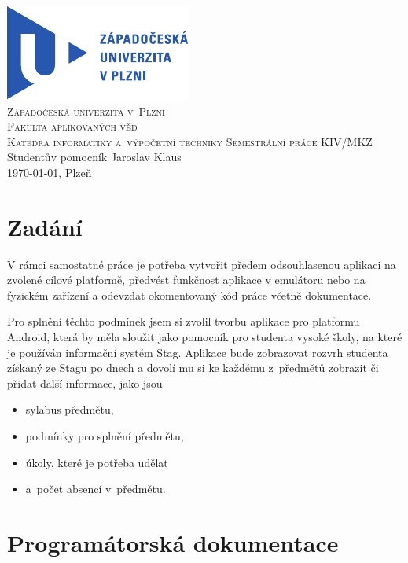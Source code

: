 \documentclass[12pt, a4paper]{article}
\begin{document}
	\begin{titlepage}
		\begin{center}
			\includegraphics{img/ZCULogo.pdf}\\[1cm]
			\textsc{\LARGE Západočeská univerzita v~Plzni}\\[0.1cm]
			\textsc{\Large Fakulta aplikovaných věd}\\[0.1cm]
			\textsc{\large Katedra informatiky a~výpočetní techniky}
			\vfill
			\textsc{\LARGE Semestrální práce KIV/MKZ}\\[0.2cm]
			\LARGE{Studentův pomocník}
			\vfill
			Jaroslav Klaus\\[0.2cm]
			\today, Plzeň
		\end{center}
	\end{titlepage}

	\tableofcontents
	\newpage

	\section{Zadání}
	V rámci samostatné práce je potřeba vytvořit předem odsouhlasenou aplikaci na zvolené cílové platformě, předvést funkčnost aplikace v emulátoru nebo na fyzickém zařízení a odevzdat okomentovaný kód práce včetně dokumentace.
	
	Pro splnění těchto podmínek jsem si zvolil tvorbu aplikace pro platformu Android, která by měla sloužit jako pomocník pro studenta vysoké školy, na které je používán informační systém Stag. Aplikace bude zobrazovat rozvrh studenta získaný ze Stagu po dnech a dovolí mu si ke každému z~předmětů zobrazit či přidat další informace, jako jsou
		\begin{itemize}
			\item sylabus předmětu,
			\item podmínky pro splnění předmětu,
			\item úkoly, které je potřeba udělat
			\item a~počet absencí v~předmětu.
		\end{itemize}
	
	\section{Programátorská dokumentace}
	
\end{document}
